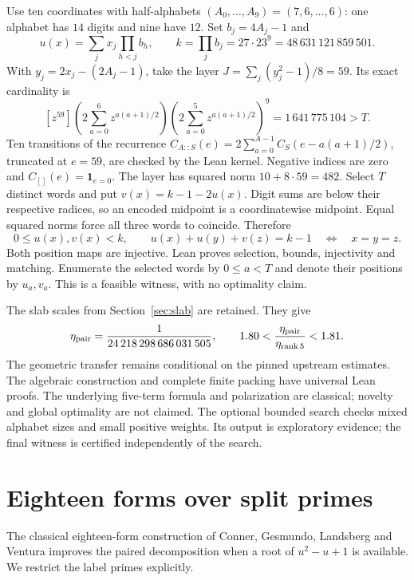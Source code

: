 \documentclass[11pt]{article}
\begin{document}
Use ten coordinates with half-alphabets
$(A_0,\ldots,A_9)=(7,6,\ldots,6)$: one alphabet has $14$ digits and nine
have $12$. Set $b_j=4A_j-1$ and
\[
 u(x)=\sum_jx_j\prod_{h<j}b_h,\qquad
 k=\prod_jb_j=27\cdot23^9=48\,631\,121\,859\,501.
\]
With $y_j=2x_j-(2A_j-1)$, take the layer
$J=\sum_j(y_j^2-1)/8=59$. Its exact cardinality is
\[
 [z^{59}]\left(2\sum_{a=0}^6z^{a(a+1)/2}\right)
 \left(2\sum_{a=0}^5z^{a(a+1)/2}\right)^9
 =1\,641\,775\,104>T.
\]
Ten transitions of the recurrence $C_{A::S}(e)=
2\sum_{a=0}^{A-1}C_S(e-a(a+1)/2)$, truncated at $e=59$, are checked
by the Lean kernel. Negative indices are zero and $C_{[]}(e)=\mathbf1_{e=0}$.
The layer has squared norm $10+8\cdot59=482$. Select $T$ distinct words
and put $v(x)=k-1-2u(x)$. Digit sums are below their respective radices,
so an encoded midpoint is a coordinatewise midpoint. Equal squared norms
force all three words to coincide. Therefore
\[
 0\le u(x),v(x)<k,\qquad
 u(x)+u(y)+v(z)=k-1\quad\Longleftrightarrow\quad x=y=z.
\]
Both position maps are injective. Lean proves selection, bounds, injectivity
and matching. Enumerate the selected words by $0\le a<T$ and denote their
positions by $u_a,v_a$. This is a feasible witness, with no optimality claim.


The slab scales from Section~\ref{sec:slab} are retained. They give
\[
 \eta_{\rm pair}=\frac{1}{24\,218\,298\,686\,031\,505},\qquad
 1.80<\frac{\eta_{\rm pair}}{\eta_{\rm rank\,5}}<1.81.
\]
The geometric transfer remains conditional on the pinned upstream
estimates. The algebraic construction and complete finite packing have
universal Lean proofs. The underlying five-term formula and polarization
are classical; novelty and global optimality are not claimed.
The optional bounded search checks mixed alphabet sizes and small positive
weights. Its output is exploratory evidence; the final witness is certified
independently of the search.

\section{Eighteen forms over split primes}\label{sec:eighteen}
The classical eighteen-form construction of Conner, Gesmundo, Landsberg
and Ventura \cite{cglv} improves the paired decomposition when a root
of $u^2-u+1$ is available. We restrict the label primes explicitly.
\end{document}
